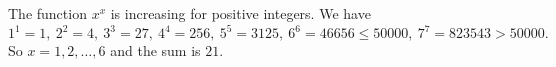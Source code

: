 The function $x^x$ is increasing for positive integers. We have
\[
1^1=1,\ 2^2=4,\ 3^3=27,\ 4^4=256,\ 5^5=3125,\ 6^6=46656\le50000,\ 7^7=823543>50000 .
\]
So $x=1,2,\dots,6$ and the sum is $\boxed{21}$.
